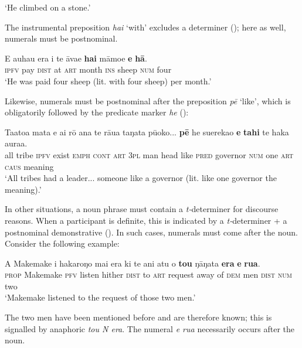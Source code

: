 \glt 
‘He climbed on a stone.’ \textstyleExampleref{[R229.347]} 
\z

The instrumental preposition \textit{hai} ‘with’ excludes a determiner (); here as well, numerals must be postnominal.

\ea\label{ex:5.65}
\gll E {\ꞌ}auhau era {\ꞌ}i te {\ꞌ}āva{\ꞌ}e \textbf{hai} māmoe \textbf{e} \textbf{hā}. \\
\textsc{ipfv} pay \textsc{dist} at \textsc{art} month \textsc{ins} sheep \textsc{num} four \\

\glt
‘He was paid four sheep (lit. with four sheep) per month.’ \textstyleExampleref{[R250.053]} 
\z

Likewise, numerals must be postnominal after the preposition \textit{pē} ‘like’, which is obligatorily followed by the predicate marker \textit{he} ():

\ea\label{ex:5.66}
\gll Ta{\ꞌ}ato{\ꞌ}a mata e ai rō {\ꞌ}ana te rāua taŋata pū{\ꞌ}oko... \textbf{pē} he suerekao  \textbf{e} \textbf{tahi} te haka aura{\ꞌ}a.\\
all tribe \textsc{ipfv} exist \textsc{emph} \textsc{cont} \textsc{art} \textsc{3pl} man head like \textsc{pred} governor  \textsc{num} one \textsc{art} \textsc{caus} meaning\\

\glt 
‘All tribes had a leader... someone like a governor (lit. like one governor the meaning).’ \textstyleExampleref{[R371.006]} 
\z

In other situations, a noun phrase must contain a \textit{t-}determiner for discourse reasons. When a participant is definite, this is indicated by a \textit{t-}determiner + a postnominal demonstrative (). In such cases, numerals must come after the noun. Consider the following example: 

\ea\label{ex:5.67}
\gll A Makemake i hakaroŋo mai era ki te ani atu o \textbf{tou} ŋāŋata \textbf{era}  \textbf{e} \textbf{rua}.\\
\textsc{prop} Makemake \textsc{pfv} listen hither \textsc{dist} to \textsc{art} request away of \textsc{dem} men \textsc{dist}  \textsc{num} two\\

\glt
‘Makemake listened to the request of those two men.’ \textstyleExampleref{[Fel-40.044]}
\z

The two men have been mentioned before and are therefore known; this is signalled by anaphoric \textit{tou N era}. The numeral \textit{e rua} necessarily occurs after the noun.

